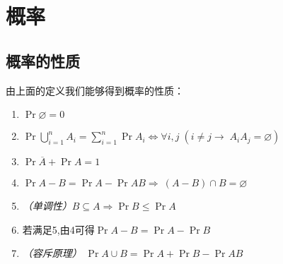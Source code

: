 \section{概率}
\subsection{概率的性质}
由上面的定义我们能够得到概率的性质：
\begin{enumerate}
    \item
          $\Pr{\varnothing}=0$
    \item
          $\Pr{\bigcup_{i=1}^{n} A_i}=\sum_{i=1}^n\Pr{A_i}\iff\forall i,j\;(i\neq j\to\; A_iA_j = \varnothing)$
    \item
          $\Pr{\overline A} + \Pr{A} = 1$
    \item
          $\Pr{A-B} = \Pr{A} - \Pr{AB}\Rightarrow\ (A-B) \cap B = \varnothing$
    \item
          \textit{（单调性）}$B\subseteq A \Rightarrow \Pr{B}\leq\Pr{A}$
    \item
          若满足5,由4可得$\Pr{A-B} = \Pr{A} - \Pr{B}$
    \item
          \textit{（容斥原理）}
          $\Pr{A\cup B}=\Pr{A} + \Pr{B} - \Pr{AB}$
\end{enumerate}
